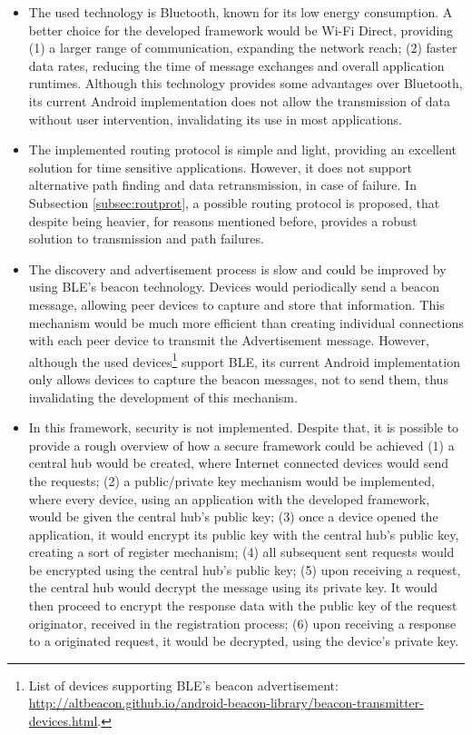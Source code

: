 \begin{itemize}
	\item The used technology is Bluetooth, known for its low energy consumption. A better choice for the developed framework would be Wi-Fi Direct, providing (1) a larger range of communication, expanding the network reach; (2) faster data rates, reducing the time of message exchanges and overall application runtimes. Although this technology provides some advantages over Bluetooth, its current Android implementation does not allow the transmission of data without user intervention, invalidating its use in most applications.
	
	\item The implemented routing protocol is simple and light, providing an excellent solution for time sensitive applications. However, it does not support alternative path finding and data retransmission, in case of failure. In Subsection \ref{subsec:routprot}, a possible routing protocol is proposed, that despite being heavier, for reasons mentioned before, provides a robust solution to transmission and path failures.
	
	\item The discovery and advertisement process is slow and could be improved by using \gls{BLE}'s beacon technology. Devices would periodically send a beacon message, allowing peer devices to capture and store that information. This mechanism would be much more efficient than creating individual connections with each peer device to transmit the Advertisement message. However, although the used devices\footnote{List of devices supporting \gls{BLE}'s beacon advertisement: \url{http://altbeacon.github.io/android-beacon-library/beacon-transmitter-devices.html}.} support \gls{BLE}, its current Android implementation only allows devices to capture the beacon messages, not to send them, thus invalidating the development of this mechanism.
	
	\item In this framework, security is not implemented. Despite that, it is possible to provide a rough overview of how a secure framework could be achieved (1) a central hub would be created, where Internet connected devices would send the requests; (2) a public/private key mechanism would be implemented, where every device, using an application with the developed framework, would be given the central hub's public key; (3) once a device opened the application, it would encrypt its public key with the central hub's public key, creating a sort of register mechanism; (4) all subsequent sent requests would be encrypted using the central hub's public key; (5) upon receiving a request, the central hub would decrypt the message using its private key. It would then proceed to encrypt the response data with the public key of the request originator, received in the registration process; (6) upon receiving a response to a originated request, it would be decrypted, using the device's private key.
	

\end{itemize}

